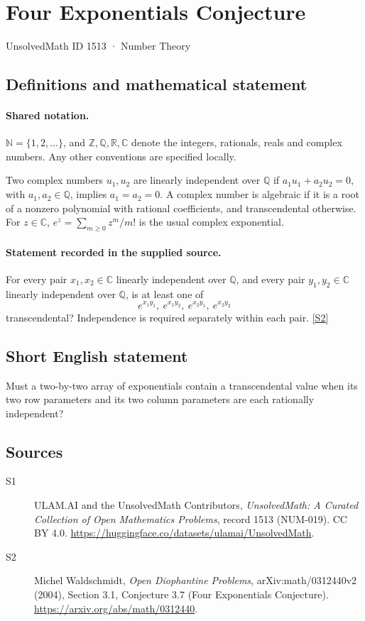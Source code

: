 \documentclass[11pt]{article}
\newcommand{\sref}[2]{\hyperlink{source:#1:#2}{[S#2]}}
\begin{document}
\setcounter{section}{1512}
\section{Four Exponentials Conjecture}\label{1513}
{\small\sffamily UnsolvedMath ID 1513 · Number Theory}
\subsection{Definitions and mathematical statement}

\paragraph{Shared notation.}$\mathbb N=\{1,2,\ldots\}$, and $\mathbb Z,\mathbb Q,\mathbb R,\mathbb C$ denote the integers, rationals, reals and complex numbers. Any other conventions are specified locally.


Two complex numbers \(u_1,u_2\) are linearly independent over
\(\mathbb Q\) if \(a_1u_1+a_2u_2=0\), with
\(a_1,a_2\in\mathbb Q\), implies \(a_1=a_2=0\).
A complex number is algebraic if it is a root of a nonzero polynomial
with rational coefficients, and transcendental otherwise.
For \(z\in\mathbb C\), \(e^z=\sum_{m\ge0}z^m/m!\) is the
usual complex exponential.
\paragraph{Statement recorded in the supplied source.}
For every pair \(x_1,x_2\in\mathbb C\) linearly independent over
\(\mathbb Q\), and every pair \(y_1,y_2\in\mathbb C\) linearly
independent over \(\mathbb Q\), is at least one of
\[
             e^{x_1y_1},\ e^{x_1y_2},\ e^{x_2y_1},\ e^{x_2y_2}
\]
transcendental? Independence is required separately within each pair. \sref{1513}{2}
\subsection{Short English statement}
Must a two-by-two array of exponentials contain a transcendental value when its two row parameters and its two column parameters are each rationally independent?
\subsection{Sources}
\begin{description}
\item[\hypertarget{source:1513:1}{S1}] ULAM.AI and the UnsolvedMath Contributors, \emph{UnsolvedMath: A Curated Collection of Open Mathematics Problems}, record 1513 (NUM-019). CC BY 4.0. \url{https://huggingface.co/datasets/ulamai/UnsolvedMath}.
\item[\hypertarget{source:1513:2}{S2}] Michel Waldschmidt, \emph{Open Diophantine Problems}, arXiv:math/0312440v2 (2004), Section 3.1, Conjecture 3.7 (Four Exponentials Conjecture). \url{https://arxiv.org/abs/math/0312440}.
\end{description}
\label{end:1513}
\end{document}
